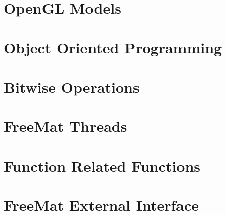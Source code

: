 \documentclass{book}
\begin{document}
\chapter{OpenGL Models}





\chapter{Object Oriented Programming}


































\chapter{Bitwise Operations}




\chapter{FreeMat Threads}








\chapter{Function Related Functions}


\chapter{FreeMat External Interface}












\end{document}
